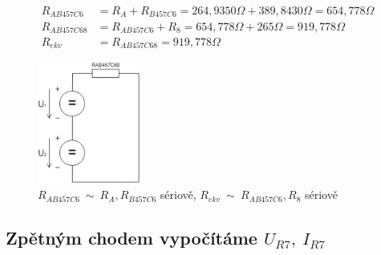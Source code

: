 \begin{align*}
R_{AB457C6} &= R_A + R_{B457C6} = 264,9350\Omega + 389,8430\Omega = 654,778\Omega\\
R_{AB457C68} &= R_{AB457C6} + R_8 = 654,778\Omega + 265\Omega = 919,778\Omega\\
R_{ekv} &= R_{AB457C68} = 919,778\Omega
\end{align*}

\begin{figure}[H]
    \centering
    \includegraphics[width=0.3\textwidth]{fig/Pr1_6.png}
    \caption{$R_{AB457C6}~\sim~R_A,R_{B457C6}$ sériově, $R_{ekv}~\sim~R_{AB457C6},R_8$ sériově}
\end{figure}

\subsection{Zpětným chodem vypočítáme $U_{R7},~I_{R7}$ }

